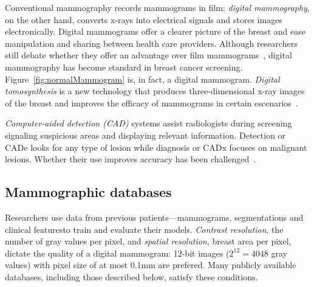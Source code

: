 Conventional mammography records mammograms in film; \emph{digital mammography}, on the other hand, converts x-rays into electrical signals and stores images electronically.
Digital mammograms offer a clearer picture of the breast and ease manipulation and sharing between health care providers.
Although researchers still debate whether they offer an advantage over film mammograms~\cite{Kerlikowske2011, Pisano2008, Skaane2007}, digital mammography has become standard in breast cancer screening. Figure~\ref{fig:normalMammogram} is, in fact, a digital mammogram.
\emph{Digital tomosynthesis} is a new technology that produces three-dimensional x-ray images of the breast and improves the efficacy of mammograms in certain escenarios~\cite{Tagliafico2016}.%

\emph{Computer-aided detection (CAD)} systems assist radiologists during screening signaling suspicious areas and displaying relevant information. Detection or CADe looks for any type of lesion while diagnosis or CADx focuses on malignant lesions. Whether their use improves accuracy has been challenged~\cite{Lehman2015}.

\subsection{Mammographic databases}
Researchers use data from previous patients---mammograms, segmentations and clinical features\textemdash to train and evaluate their models. 
\emph{Contrast resolution}, the number of gray values per pixel, and \emph{spatial resolution}, breast area per pixel, dictate the quality of a digital mammogram: 12-bit images ($2^{12} = 4048$ gray values) with pixel size of at most 0.1mm are prefered. Many publicly available databases, including those described below, satisfy these conditions.

